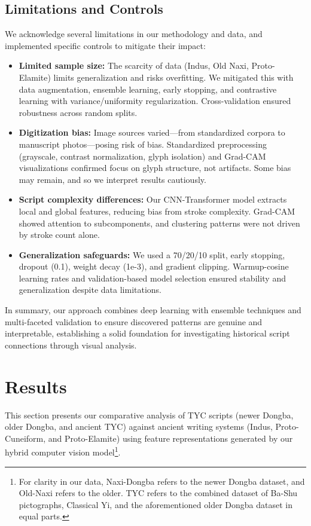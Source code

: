 \documentclass[11pt,a4paper,oneside]{report}
\begin{document}
\section{Limitations and Controls}
\noindent\hspace{1cm}
We acknowledge several limitations in our methodology and data, and implemented specific controls to mitigate their impact:

\begin{itemize}

    \item \textbf{Limited sample size:} The scarcity of data (Indus, Old Naxi, Proto-Elamite) limits generalization and risks overfitting. We mitigated this with data augmentation, ensemble learning, early stopping, and contrastive learning with variance/uniformity regularization. Cross-validation ensured robustness across random splits.

    \item \textbf{Digitization bias:} Image sources varied—from standardized corpora to manuscript photos—posing risk of bias. Standardized preprocessing (grayscale, contrast normalization, glyph isolation) and Grad-CAM visualizations confirmed focus on glyph structure, not artifacts. Some bias may remain, and so we interpret results cautiously.

    \item \textbf{Script complexity differences:} Our CNN-Transformer model extracts local and global features, reducing bias from stroke complexity. Grad-CAM showed attention to subcomponents, and clustering patterns were not driven by stroke count alone.

    \item \textbf{Generalization safeguards:} We used a 70/20/10 split, early stopping, dropout (0.1), weight decay (1e-3), and gradient clipping. Warmup-cosine learning rates and validation-based model selection ensured stability and generalization despite data limitations.

\end{itemize}

In summary, our approach combines deep learning with ensemble techniques and multi-faceted validation to ensure discovered patterns are genuine and interpretable, establishing a solid foundation for investigating historical script connections through visual analysis.

\chapter{Results}
\label{results}
\noindent\hspace{1cm}
This section presents our comparative analysis of TYC scripts (newer Dongba, older Dongba, and ancient TYC) against ancient writing systems (Indus, Proto-Cuneiform, and Proto-Elamite) using feature representations generated by our hybrid computer vision model\footnote{For clarity in our data, Naxi-Dongba refers to the newer Dongba dataset, and Old-Naxi refers to the older. TYC refers to the combined dataset of Ba-Shu pictographs, Classical Yi, and the aforementioned older Dongba dataset in equal parts.}.
\end{document}
